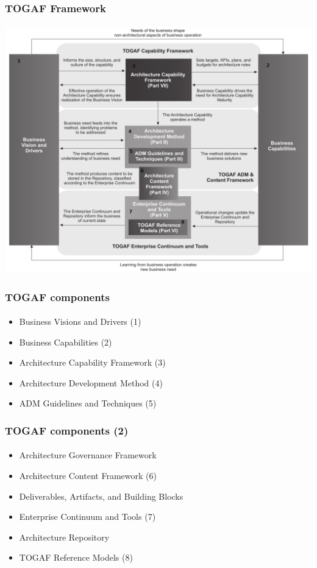 \documentclass[aspectratio=169, table]{beamer}
\begin{document}
	{
		\begin{frame}
			\frametitle{TOGAF Framework}
			\framesubtitle{\hspace{1cm}}
			\begin{center}
				\includegraphics[width=.78\textwidth]{../figures/togaf}
			\end{center}
		\end{frame}
	}
	
	\begin{frame}
		\frametitle{TOGAF components}
		\framesubtitle{\hspace{1cm}}
		\begin{itemize}
			\item Business Visions and Drivers (1)
			\item Business Capabilities (2)
			\item Architecture Capability Framework (3)
			\item Architecture Development Method (4)
			\item ADM Guidelines and Techniques (5)
		\end{itemize}
	\end{frame}
	
	\begin{frame}
		\frametitle{TOGAF components (2)}
		\framesubtitle{\hspace{1cm}}
		\begin{itemize}
			
			\item Architecture Governance Framework 
			\item Architecture Content Framework (6)
			\item Deliverables, Artifacts, and Building Blocks
			\item Enterprise Continuum and Tools (7) 
			\item Architecture Repository
			\item TOGAF Reference Models (8)
		\end{itemize}
	\end{frame}
	
\end{document}
